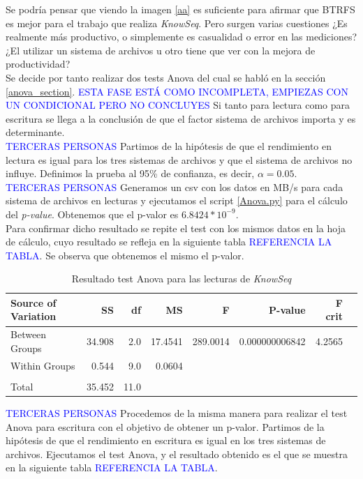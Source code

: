 Se podría pensar que viendo la imagen \ref{aa} es suficiente para afirmar que BTRFS es mejor para el trabajo que realiza \textit{KnowSeq}. Pero surgen varias cuestiones ¿Es realmente más productivo, o simplemente es casualidad o error en las mediciones?  ¿El utilizar un sistema de archivos u otro tiene que ver con la mejora de productividad?\\

Se decide por tanto realizar dos tests Anova del cual se habló en la sección \ref{anova_section}. \textcolor{blue}{ESTA FASE ESTÁ COMO INCOMPLETA, EMPIEZAS CON UN CONDICIONAL PERO NO CONCLUYES} Si tanto para lectura como para escritura se llega a la conclusión de que el factor sistema de archivos importa y es determinante.\\

\textcolor{blue}{TERCERAS PERSONAS} Partimos de la hipótesis de que el rendimiento en lectura es igual para los tres sistemas de archivos y que el sistema de archivos no influye. Definimos la prueba al 95\% de confianza, es decir, $\alpha = 0.05$.\\

\textcolor{blue}{TERCERAS PERSONAS} Generamos un csv con los datos en MB/s para cada sistema de archivos en lecturas y ejecutamos el script \ref{Anova.py} para el cálculo del \textit{p-value}. Obtenemos que el p-valor es $6.8424*10^{-9}$.\\

Para confirmar dicho resultado se repite el test con los mismos datos en la hoja de cálculo, cuyo resultado se refleja en la siguiente tabla \textcolor{blue}{REFERENCIA LA TABLA}. Se observa que obtenemos el mismo el p-valor. 

\begin{table}[!htp]\centering
\scriptsize
\begin{tabular}{lrrrrrrr}\toprule
Source of Variation &SS &df &MS &F &P-value &F crit \\\midrule
Between Groups &34.908 &2.0 &17.4541 &289.0014 &0.000000006842 &4.2565 \\
Within Groups &0.544 &9.0 &0.0604 & & & \\
& & & & & & \\
Total &35.452 &11.0 & & & & \\
\bottomrule
\end{tabular}
\caption{Resultado test Anova para las lecturas de \textit{KnowSeq}}\label{tab: }
\end{table}

\textcolor{blue}{TERCERAS PERSONAS} Procedemos de la misma manera para realizar el test Anova para escritura con el objetivo de obtener un p-valor. Partimos de la hipótesis de que el rendimiento en escritura es igual en los tres sistemas de archivos. Ejecutamos el test Anova, y el resultado obtenido es el que se muestra en la siguiente tabla \textcolor{blue}{REFERENCIA LA TABLA}.

